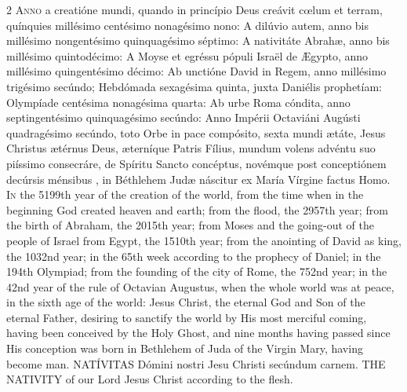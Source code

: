 \begin{paracol}{2}
\lettrine[lines=2]{A}{nno } a creatióne mundi, quando 
 in princípio Deus creávit cœlum et terram, quínquies millésimo centésimo 
 nonagésimo nono: A dilúvio autem, anno bis millésimo nongentésimo 
 quinquagésimo séptimo: A nativitáte Abrahæ, anno bis millésimo quintodécimo: 
 A Moyse et egréssu pópuli Israël de Ægypto, anno millésimo quingentésimo 
 décimo: Ab unctióne David in Regem, anno millésimo trigésimo secúndo; 
 Hebdómada sexagésima quinta, juxta Daniélis prophetíam: Olympíade centésima 
 nonagésima quarta: Ab urbe Roma cóndita, anno septingentésimo quinquagésimo 
 secúndo: Anno Impérii Octaviáni Augústi quadragésimo secúndo, toto Orbe in 
 pace compósito, sexta mundi ætáte, Jesus Christus ætérnus Deus, æterníque 
 Patris Fílius, mundum volens advéntu suo piíssimo consecráre, de Spíritu 
 Sancto concéptus, novémque post conceptiónem decúrsis ménsibus
	, in Béthlehem Judæ náscitur ex María Vírgine factus Homo.
\switchcolumn
{}
\lettrine[lines=2]{I}{n } the 5199th year 
 of the creation of the world, from the time when in the beginning God 
 created heaven and earth; from the flood, the 2957th year; from 
 the birth of Abraham, the 2015th year; from Moses and the 
 going-out of the people of Israel from Egypt, the 1510th year; from 
 the anointing of David as king, the 1032nd year; in the 65th 
 week according to the prophecy of Daniel; in the 194th Olympiad; 
 from the founding of the city of Rome, the 752nd year; in the 42nd 
 year of the rule of Octavian Augustus, when the whole world was at peace, in 
 the sixth age of the world: Jesus Christ, the eternal God and Son of the 
 eternal Father, desiring to sanctify the world by His most merciful coming, 
 having been conceived by the Holy Ghost, and nine months having passed since 
	His conception  was born in 
 Bethlehem of Juda of the Virgin Mary, having become man.
\switchcolumn*
{}
	 NATÍVITAS Dómini nostri Jesu Christi secúndum carnem. 
\switchcolumn
{}
	 THE NATIVITY of our Lord Jesus Christ according to the flesh. 
\switchcolumn*
{}

\end{paracol}
